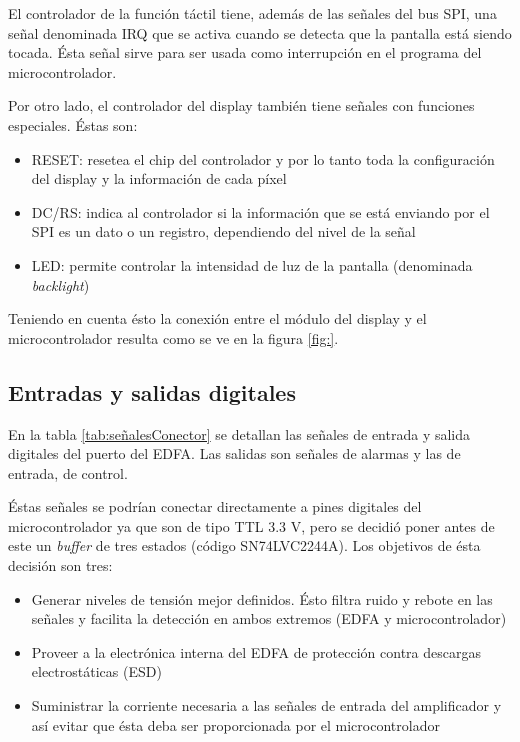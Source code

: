El controlador de la función táctil tiene, además de las señales del bus SPI, una señal denominada IRQ que se activa cuando se detecta que la pantalla está siendo tocada. Ésta señal sirve para ser usada como interrupción en el programa del microcontrolador.

Por otro lado, el controlador del display también tiene señales con funciones especiales. Éstas son:

\begin{itemize}
\item RESET: resetea el chip del controlador y por lo tanto toda la configuración del display y la información de cada píxel
\item DC/RS: indica al controlador si la información que se está enviando por el SPI es un dato o un registro, dependiendo del nivel de la señal
\item LED: permite controlar la intensidad de luz de la pantalla (denominada \textit{backlight})
\end{itemize}

Teniendo en cuenta ésto la conexión entre el módulo del display y el microcontrolador resulta como se ve en la figura \ref{fig:}.

\subsection{Entradas y salidas digitales}

En la tabla \ref{tab:señalesConector} se detallan las señales de entrada y salida digitales del puerto del EDFA. Las salidas son señales de alarmas y las de entrada, de control.

Éstas señales se podrían conectar directamente a pines digitales del microcontrolador ya que son de tipo TTL 3.3 V, pero se decidió poner antes de este un \textit{buffer} de tres estados (código SN74LVC2244A). Los objetivos de ésta decisión son tres:

\begin{itemize}
\item Generar niveles de tensión mejor definidos. Ésto filtra ruido y rebote en las señales y facilita la detección en ambos extremos (EDFA y microcontrolador)
\item Proveer a la electrónica interna del EDFA de protección contra descargas electrostáticas (ESD)
\item Suministrar la corriente necesaria a las señales de entrada del amplificador y así evitar que ésta deba ser proporcionada por el microcontrolador
\end{itemize}

